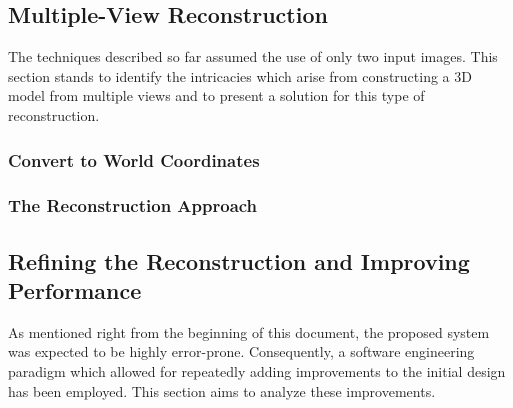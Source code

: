 \documentclass[12pt,a4paper,twoside,openright]{report}
\begin{document}
\subsection{Multiple-View Reconstruction}
The techniques described so far assumed the use of only two input images. This section stands to identify the intricacies which arise from constructing a 3D model from multiple views and to present a solution for this type of reconstruction.

\subsubsection{Convert to World Coordinates}
\subsubsection{The Reconstruction Approach}

\subsection{Refining the Reconstruction and Improving Performance}
As mentioned right from the beginning of this document, the proposed system was expected to be highly error-prone. Consequently, a software engineering paradigm which allowed for repeatedly adding improvements to the initial design has been employed. This section aims to analyze these improvements.
\end{document}
